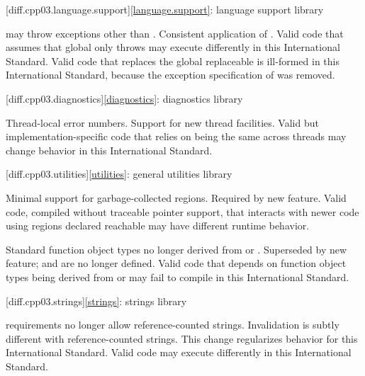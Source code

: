 [diff.cpp03.language.support]{\ref{language.support}:
language support library}

\change
{} may throw exceptions other than
.
\rationale
Consistent application of .
\effect
Valid \CppIII{} code that assumes that global  only
throws  may execute differently in this International
Standard.
Valid \CppIII{} code that replaces the global replaceable 
is ill-formed in this International Standard,
because the exception specification of 
was removed.

[diff.cpp03.diagnostics]{\ref{diagnostics}: diagnostics library}

\change
Thread-local error numbers.
\rationale
Support for new thread facilities.
\effect
Valid but implementation-specific \CppIII{} code that relies on
 being the same across threads may change behavior in this
International Standard.

[diff.cpp03.utilities]{\ref{utilities}: general utilities library}

\change
Minimal support for garbage-collected regions.
\rationale
Required by new feature.
\effect
Valid \CppIII{} code, compiled without traceable pointer support,
that interacts with newer \Cpp{} code using regions declared reachable may
have different runtime behavior.

\change
Standard function object types no longer derived from
 or .
\rationale
Superseded by new feature;  and
 are no longer defined.
\effect
Valid \CppIII{} code that depends on function object types being derived from
 or  may fail to compile
in this International Standard.

[diff.cpp03.strings]{\ref{strings}: strings library}

\change
{} requirements no longer allow reference-counted
strings.
\rationale
Invalidation is subtly different with reference-counted strings.
This change regularizes behavior for this International Standard.
\effect
Valid \CppIII{} code may execute differently in this International Standard.

